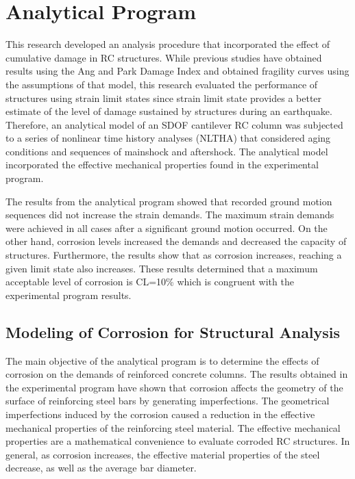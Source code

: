 \chapter{Analytical Program}
\label{chap-five}
This research developed an analysis procedure that incorporated the effect of cumulative damage in RC structures. While previous studies have obtained results using the Ang and Park Damage Index and obtained fragility curves using the assumptions of that model, this research evaluated the performance of structures using strain limit states since strain limit state provides a better estimate of the level of damage sustained by structures during an earthquake. Therefore, an analytical model of an SDOF cantilever RC column was subjected to a series of nonlinear time history analyses (NLTHA) that considered aging conditions and sequences of mainshock and aftershock. The analytical model incorporated the effective mechanical properties found in the experimental program. 

The results from the analytical program showed that recorded ground motion sequences did not increase the strain demands. The maximum strain demands were achieved in all cases after a significant ground motion occurred. On the other hand, corrosion levels increased the demands and decreased the capacity of structures. Furthermore, the results show that as corrosion increases, reaching a given limit state also increases. These results determined that a maximum acceptable level of corrosion is CL=10\% which is congruent with the experimental program results.

\section{Modeling of Corrosion for Structural Analysis}

The main objective of the analytical program is to determine the effects of corrosion on the demands of reinforced concrete columns. The results obtained in the experimental program have shown that corrosion affects the geometry of the surface of reinforcing steel bars by generating imperfections. The geometrical imperfections induced by the corrosion caused a reduction in the effective mechanical properties of the reinforcing steel material. The effective mechanical properties are a mathematical convenience to evaluate corroded RC structures. In general, as corrosion increases, the effective material properties of the steel decrease, as well as the average bar diameter.

